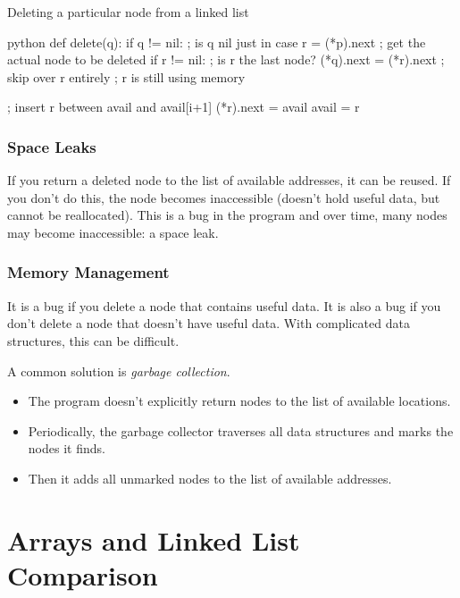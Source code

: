 \begin{highlight}{Deleting a particular node from a linked list}
    \begin{code}{python}
        def delete(q):
        if q != nil: ; is q nil just in case
        r = (*p).next ; get the actual node to be deleted
        if r != nil: ; is r the last node?
        (*q).next = (*r).next ; skip over r entirely
        ; r is still using memory

        ; insert r between avail and avail[i+1]
        (*r).next = avail
        avail = r
    \end{code}
\end{highlight}

\subsubsection{Space Leaks}\label{ssub:space_leaks}

If you return a deleted node to the list of available addresses, it can be reused.
If you don't do this, the node becomes inaccessible (doesn't hold useful data, but cannot be reallocated).
This is a bug in the program and over time, many nodes may become inaccessible: a space leak.

\subsubsection{Memory Management}\label{ssub:memory_management}

It is a bug if you delete a node that contains useful data.
It is also a bug if you don't delete a node that doesn't have useful data.
With complicated data structures, this can be difficult.

A common solution is \emph{garbage collection}.
\begin{itemize}
    \item The program doesn't explicitly return nodes to the list of available locations.
    \item Periodically, the garbage collector traverses all data structures and marks the nodes it finds.
    \item Then it adds all unmarked nodes to the list of available addresses.
\end{itemize}

\section{Arrays and Linked List Comparison}\label{sec:arrays_and_linked_list_comparison}


